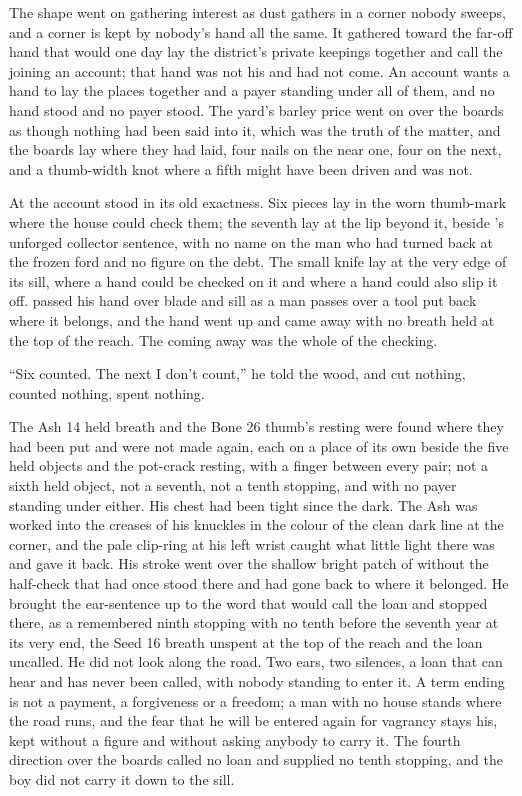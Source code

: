 The shape went on gathering interest as dust gathers in a corner nobody sweeps, and a corner is kept by nobody's hand all the same. It gathered toward the far-off hand that would one day lay the district's private keepings together and call the joining an account; that hand was not his and had not come. An account wants a hand to lay the places together and a payer standing under all of them, and no hand stood and no payer stood. The yard's barley price went on over the boards as though nothing had been said into it, which was the truth of the matter, and the boards lay where they had laid, four nails on the near one, four on the next, and a thumb-width knot where a fifth might have been driven and was not.

\scenebreak

At  the account stood in its old exactness. Six pieces lay in the worn thumb-mark where the house could check them; the seventh lay at the lip beyond it, beside 's unforged collector sentence, with no name on the man who had turned back at the frozen ford and no figure on the debt. The small knife lay at the very edge of its sill, where a hand could be checked on it and where a hand could also slip it off.  passed his hand over blade and sill as a man passes over a tool put back where it belongs, and the hand went up and came away with no breath held at the top of the reach. The coming away was the whole of the checking.

“Six counted. The next I don't count,” he told the wood, and cut nothing, counted nothing, spent nothing.

The Ash 14 held breath and the Bone 26 thumb's resting were found where they had been put and were not made again, each on a place of its own beside the five held objects and the pot-crack resting, with a finger between every pair; not a sixth held object, not a seventh, not a tenth stopping, and with no payer standing under either. His chest had been tight since the dark. The Ash was worked into the creases of his knuckles in the colour of the clean dark line at the corner, and the pale clip-ring at his left wrist caught what little light there was and gave it back. His stroke went over the shallow bright patch of  without the half-check that had once stood there and had gone back to where it belonged. He brought the ear-sentence up to the word that would call the loan and stopped there, as a remembered ninth stopping with no tenth before the seventh year at its very end, the Seed 16 breath unspent at the top of the reach and the loan uncalled. He did not look along the road. Two ears, two silences, a loan that can hear and has never been called, with nobody standing to enter it. A term ending is not a payment, a forgiveness or a freedom; a man with no house stands where the road runs, and the fear that he will be entered again for vagrancy stays his, kept without a figure and without asking anybody to carry it. The fourth direction over the boards called no loan and supplied no tenth stopping, and the boy did not carry it down to the sill.

